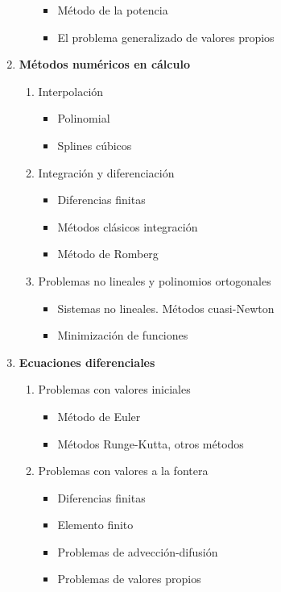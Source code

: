 \begin{enumerate}
\begin{enumerate}
\begin{itemize}
			            \item Método de la potencia
			            \item El problema generalizado de valores propios
		            \end{itemize}
	      \end{enumerate}
	\item \textbf{Métodos numéricos en cálculo}
	      \begin{enumerate}
		      \item Interpolación
		            \begin{itemize}
			            \item Polinomial
			            \item Splines cúbicos
		            \end{itemize}
		      \item Integración y diferenciación
		            \begin{itemize}
			            \item Diferencias finitas
			            \item Métodos clásicos integración
			            \item Método de Romberg
		            \end{itemize}
		      \item Problemas no lineales y polinomios ortogonales
		            \begin{itemize}
			            \item Sistemas no lineales. Métodos cuasi-Newton
			            \item Minimización de funciones
		            \end{itemize}
	      \end{enumerate}
	\item \textbf{Ecuaciones diferenciales}
	      \begin{enumerate}
		      \item Problemas con valores iniciales
		            \begin{itemize}
			            \item Método de Euler
			            \item Métodos Runge-Kutta, otros métodos
		            \end{itemize}
		      \item Problemas con valores a la fontera
		            \begin{itemize}
			            \item Diferencias finitas
			            \item Elemento finito
			            \item Problemas de advección-difusión
			            \item Problemas de valores propios
		            \end{itemize}
	      \end{enumerate}
\end{enumerate}

